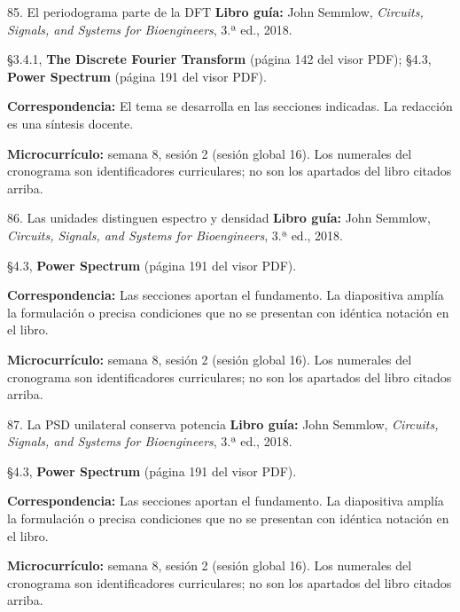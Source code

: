 \documentclass[
  10pt,
  ignorenonframetext,
  aspectratio=169,
  spanish,
]{beamer}
\begin{document}
\begin{frame}{85. El periodograma parte de la DFT}
\label{el-periodograma-parte-de-la-dft}
\textbf{Libro guía:} John Semmlow, \emph{Circuits, Signals, and Systems
for Bioengineers}, 3.ª ed., 2018.

§3.4.1, \textbf{The Discrete Fourier Transform} (página 142 del visor
PDF); §4.3, \textbf{Power Spectrum} (página 191 del visor PDF).

\textbf{Correspondencia:} El tema se desarrolla en las secciones
indicadas. La redacción es una síntesis docente.

\textbf{Microcurrículo:} semana 8, sesión 2 (sesión global 16). Los
numerales del cronograma son identificadores curriculares; no son los
apartados del libro citados arriba.
\end{frame}

\begin{frame}{86. Las unidades distinguen espectro y densidad}
\label{las-unidades-distinguen-espectro-y-densidad}
\textbf{Libro guía:} John Semmlow, \emph{Circuits, Signals, and Systems
for Bioengineers}, 3.ª ed., 2018.

§4.3, \textbf{Power Spectrum} (página 191 del visor PDF).

\textbf{Correspondencia:} Las secciones aportan el fundamento. La
diapositiva amplía la formulación o precisa condiciones que no se
presentan con idéntica notación en el libro.

\textbf{Microcurrículo:} semana 8, sesión 2 (sesión global 16). Los
numerales del cronograma son identificadores curriculares; no son los
apartados del libro citados arriba.
\end{frame}

\begin{frame}{87. La PSD unilateral conserva potencia}
\label{la-psd-unilateral-conserva-potencia}
\textbf{Libro guía:} John Semmlow, \emph{Circuits, Signals, and Systems
for Bioengineers}, 3.ª ed., 2018.

§4.3, \textbf{Power Spectrum} (página 191 del visor PDF).

\textbf{Correspondencia:} Las secciones aportan el fundamento. La
diapositiva amplía la formulación o precisa condiciones que no se
presentan con idéntica notación en el libro.

\textbf{Microcurrículo:} semana 8, sesión 2 (sesión global 16). Los
numerales del cronograma son identificadores curriculares; no son los
apartados del libro citados arriba.
\end{frame}
\end{document}
